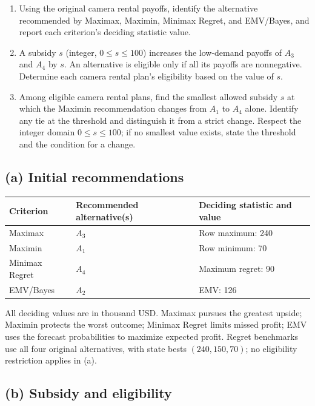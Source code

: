 \begin{enumerate}[label=\textbf{(\alph*)},leftmargin=*]
	\item Using the original camera rental payoffs, identify the alternative recommended by Maximax, Maximin, Minimax Regret, and EMV/Bayes, and report each criterion's deciding statistic value. 

	\item A subsidy $s$ (integer, $0\leq s\leq100$) increases the low-demand payoffs of $A_3$ and $A_4$ by $s$. An alternative is eligible only if all its payoffs are nonnegative. Determine each camera rental plan's eligibility based on the value of $s$. 

	\item Among eligible camera rental plans, find the smallest allowed subsidy $s$ at which the Maximin recommendation changes from $A_1$ to $A_4$ alone. Identify any tie at the threshold and distinguish it from a strict change. Respect the integer domain $0\leq s\leq100$; if no smallest value exists, state the threshold and the condition for a change. 
\end{enumerate}
\label{sol:q1a}
\subsection*{(a) Initial recommendations }
\begin{center}
\begin{tabular}{lll}\toprule
Criterion & Recommended alternative(s) & Deciding statistic and value\\ \midrule
Maximax & $A_3$ & Row maximum: 240\\
Maximin & $A_1$ & Row minimum: 70\\
Minimax Regret & $A_4$ & Maximum regret: 90\\
EMV/Bayes & $A_2$ & EMV: 126\\
\bottomrule\end{tabular}
\end{center}
All deciding values are in thousand USD. Maximax pursues the greatest upside; Maximin protects the worst outcome; Minimax Regret limits missed profit; EMV uses the forecast probabilities to maximize expected profit. Regret benchmarks use all four original alternatives, with state bests $(240,150,70)$; no eligibility restriction applies in (a).
\secInicio[sec:q1]


\label{sol:q1b}
\subsection*{(b) Subsidy and eligibility }

